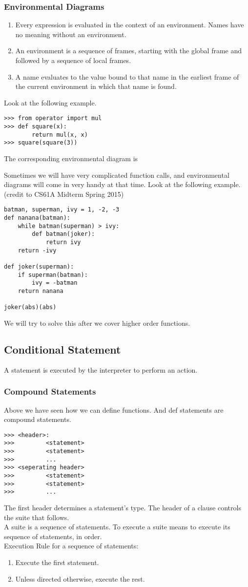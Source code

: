 \documentclass[11pt]{article}
\begin{document}
\subsubsection{Environmental Diagrams} 
\begin{enumerate}
\item Every expression is evaluated in the context of an environment. Names have no meaning without an environment. 
\item An environment is a sequence of frames, starting with the global frame and followed by a sequence of local frames.
\item A name evaluates to the value bound to that name in the earliest frame of the current environment in which that name is found. 
\end{enumerate}
Look at the following example. 
\begin{lstlisting}
>>> from operator import mul
>>> def square(x):
		return mul(x, x)
>>> square(square(3))
\end{lstlisting} 
The corresponding environmental diagram is 
\begin{figure}[h!]
\end{figure}
Sometimes we will have very complicated function calls, and environmental diagrams will come in very handy at that time. Look at the following example. (credit to CS61A Midterm Spring 2015)
\begin{lstlisting}
batman, superman, ivy = 1, -2, -3 
def nanana(batman):
	while batman(superman) > ivy: 
		def batman(joker):
			return ivy
	return -ivy

def joker(superman):
	if superman(batman):
		ivy = -batman
	return nanana
	
joker(abs)(abs)
\end{lstlisting}
We will try to solve this after we cover higher order functions. 



\subsection{Conditional Statement}
A statement is executed by the interpreter to perform an action. 
\subsubsection{Compound Statements} 
Above we have seen how we can define functions. And def statements are compound statements. 
\begin{lstlisting} 
>>> <header>: 
>>> 		<statement> 
>>> 		<statement>
>>> 		...
>>> <seperating header> 
>>> 		<statement>
>>> 		<statement>
>>> 		...
\end{lstlisting}
The first header determines a statement's type. The header of a clause controls the suite that follows. \\
A suite is a sequence of statements. To execute a suite means to execute its sequence of statements, in order. \\
Execution Rule for a sequence of statements: 
\begin{enumerate}
\item Execute the first statement.
\item Unless directed otherwise, execute the rest. 
\end{enumerate} 
\end{document}
